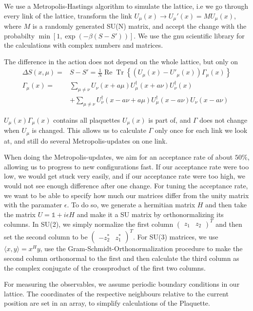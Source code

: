 \documentclass[%
 reprint,
 amsmath,amssymb,
 aps,
]{revtex4-1}
\DeclareMathOperator{\Tr}{Tr}
\renewcommand{\Re}{\operatorname{Re}}
\begin{document}
We use a Metropolis-Hastings algorithm to simulate the lattice, i.e we go through every link of the lattice, transform the link $U_\mu(x)\to U_\mu'(x)=MU_\mu(x)$, where $M$ is a randomly generated SU(N) matrix, and accept the change with the probabilty $\min[1, \exp(-\beta(S-S'))]$. We use the gnu scientific library for the calculations with complex numbers and matrices.

The difference in the action does not depend on the whole lattice, but only on \begin{align*}
\Delta S(x, \mu)=&S-S'=\frac{1}{N}\Re\Tr\left\lbrace (U_\mu(x)-U'_\mu(x))\Gamma_\mu(x)\right\rbrace\\
%
\Gamma_\mu(x)=&\sum_{\mu\neq\nu}U_\nu(x+a\mu)U_\mu^\dagger(x+a\nu)U_\nu^\dagger(x)\\
%
&+\sum_{\mu\neq\nu}U^\dagger_\nu(x-a\nu+a\mu) U^\dagger_\mu(x-a\nu)U_\nu(x-a\nu)
\end{align*}

$U_\mu(x)\Gamma_\mu(x)$ contains all plaquettes $U_\mu(x)$ is part of, and $\Gamma$ does not change when $U_\mu$ is changed. This allows us to calculate $\Gamma$ only once for each link we look at, and still do several Metropolis-updates on one link.

When doing the Metropolis-updates, we aim for an acceptance rate of about $50\%$, allowing us to progress to new configurations fast. If our acceptance rate were too low, we would get stuck very easily, and if our acceptance rate were too high, we would not see enough difference after one change.
For tuning the acceptance rate, we want to be able to specify how much our matrices differ from the unity matrix with the paramater $\epsilon$. To do so, we generate a hermitian matrix $H$   and then take the matrix $U=\mathds{1}+i\epsilon H$ and make it a SU matrix by orthonormalizing its columns. In SU(2), we simply normalize the first column $\begin{pmatrix}z_1&z_2\end{pmatrix}^T$ and then set the second column to be $\begin{pmatrix}-z_2^*&z_1^*\end{pmatrix}^T$. For SU(3) matrices, we use  $\langle x,y\rangle=x^Hy$, use the Gram-Schmidt-Orthonormalization procedure to make the second column orthonormal to the first and then calculate the third column as the complex conjugate of the crossproduct of the first two columns.

For measuring the observables, we assume periodic boundary conditions in our lattice. The coordinates of the respective neighbours relative to the current position are set in an array, to simplify calculations of the Plaquette.
\end{document}
